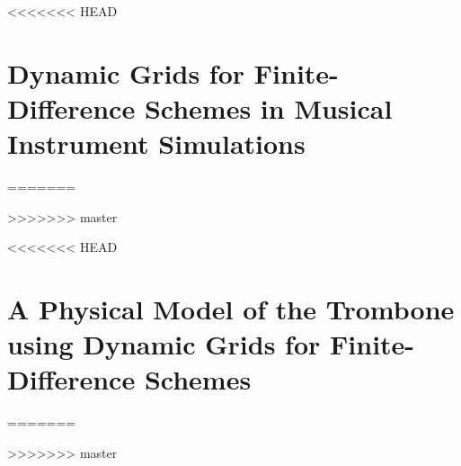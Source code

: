<<<<<<< HEAD
\chapter{Dynamic Grids for Finite-Difference Schemes in Musical Instrument Simulations}\label{paper:G}
=======

>>>>>>> master
\ifpapers
\fi

<<<<<<< HEAD
\chapter{A Physical Model of the Trombone using Dynamic Grids for Finite-Difference Schemes}\label{paper:H}
=======

>>>>>>> master
\ifpapers
\fi